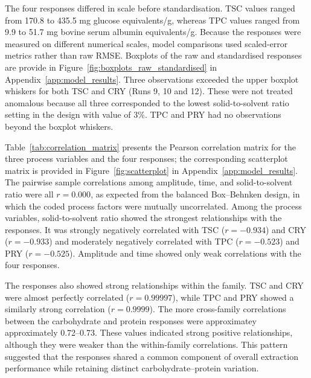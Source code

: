 \documentclass[MScDSA]{uccthesis}
\begin{document}
The four responses differed in scale before standardisation. TSC values ranged from 170.8 to 435.5 mg glucose equivalents/g, whereas TPC values ranged from 9.9 to 51.7 mg bovine serum albumin equivalents/g. Because the responses were measured on different numerical scales, model comparisons used scaled-error metrics rather than raw RMSE. Boxplots of the raw and standardised responses are provide in Figure~\ref{fig:boxplots_raw_standardised} in Appendix~\ref{app:model_results}. Three observations exceeded the upper boxplot whiskers for both TSC and CRY (Runs 9, 10 and 12). These were not treated anomalous because all three corresponded to the lowest solid-to-solvent ratio setting in the design with value of 3\%. TPC and PRY had no observations beyond the boxplot whiskers.

Table~\ref{tab:correlation_matrix} presents the Pearson correlation matrix for the three process variables and the four responses; the corresponding scatterplot matrix is provided in Figure~\ref{fig:scatterplot} in Appendix~\ref{app:model_results}. The pairwise sample correlations among amplitude, time, and solid-to-solvent ratio were all $r=0.000$, as expected from the balanced Box--Behnken design, in which the coded process factors were mutually uncorrelated. Among the process variables, solid-to-solvent ratio showed the strongest relationships with the responses. It was strongly negatively correlated with TSC ($r=-0.934$) and CRY ($r=-0.933$) and moderately negatively correlated with TPC ($r=-0.523$) and PRY ($r=-0.525$). Amplitude and time showed only weak correlations with the four responses.

The responses also showed strong relationships within the family. TSC and CRY were almost perfectly correlated ($r= 0.99997$), while TPC and PRY showed a similarly strong correlation ($r= 0.9999$). The more cross-family correlations between the carbohydrate and protein responses were approximatey approximately 0.72--0.73. These values indicated strong positive relationships, although they were weaker than the within-family correlations. This pattern suggested that the responses shared a common component of overall extraction performance while retaining distinct carbohydrate--protein variation.
\end{document}
